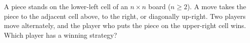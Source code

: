 A piece stands on the lower-left cell of an $n\times n$ board ($n\ge2$). A move takes the piece to the adjacent cell above, to the right, or diagonally up-right. Two players move alternately, and the player who puts the piece on the upper-right cell wins. Which player has a winning strategy?
